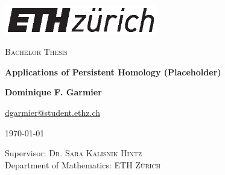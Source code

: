 \begin{titlepage}
\begin{center}
\vspace{1cm}
\includegraphics[width=0.5\textwidth]{assets/logo.eps}\\
\vspace{1cm}


\textsc{Bachelor Thesis}

\vspace{1cm}

{\huge \textbf{Applications of Persistent Homology (Placeholder)}}

\vspace{1cm}
\textbf{Dominique F. Garmier}
       
\vspace{0.15cm}
       
\href{mailto:dgarmier@student.ethz.ch}{dgarmier@student.ethz.ch}

\vspace{0.25cm}

\today

\vfill
            
\vspace{0.8cm}
     
Supervisor: \textsc{Dr. Sara Kalisnik Hintz}\\
Department of Mathematics: \textsc{ETH Zürich}\\
       
\end{center}
\end{titlepage}